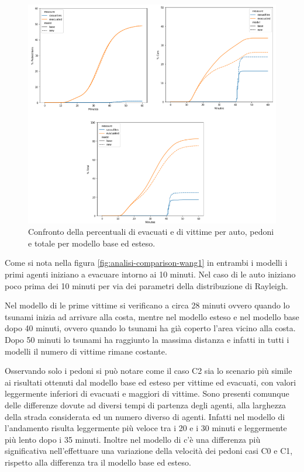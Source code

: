 \begin{figure}[ht]
    \centering
    \includegraphics[width=\textwidth]{images/analisi/WANG_comparison2.png}
    \caption{Confronto della percentuali di evacuati e di vittime per auto, pedoni e totale per modello base ed esteso.}
    \label{fig:analisi-comparison-wang2}
\end{figure}

Come si nota nella figura \ref{fig:analisi-comparison-wang1} in entrambi i modelli i primi agenti
iniziano a evacuare intorno ai 10 minuti. Nel caso di \textcite{wang2021novel} le auto iniziano
poco prima dei 10 minuti per via dei parametri della distribuzione di Rayleigh.

Nel modello di \textcite{wang2021novel} le prime vittime si verificano a circa 28 minuti ovvero quando lo tsunami inizia ad arrivare alla costa, 
mentre nel modello esteso e nel modello base dopo 40 minuti, ovvero quando lo tsunami ha già coperto l'area vicino alla costa. 
Dopo 50 minuti lo tsunami ha raggiunto la massima distanza e infatti in tutti i modelli il numero di vittime rimane costante.

Osservando solo i pedoni si può notare come il caso C2 sia lo scenario più simile ai risultati 
ottenuti dal modello base ed esteso per vittime ed evacuati, con valori leggermente inferiori di evacuati e maggiori di vittime.
Sono presenti comunque delle differenze dovute ad diversi tempi di partenza degli agenti, alla larghezza della strada considerata ed un numero diverso di agenti.
Infatti nel modello di \textcite{wang2021novel} l'andamento risulta leggermente più veloce tra i 20 e i 30 minuti
e leggermente più lento dopo i 35 minuti.
Inoltre nel modello di \textcite{wang2021novel} c'è una differenza più significativa
nell'effettuare una variazione della velocità dei pedoni casi C0 e C1, 
rispetto alla differenza tra il modello base ed esteso.

